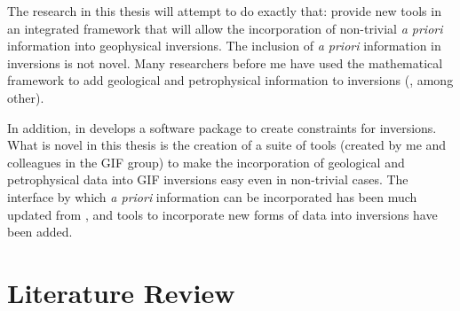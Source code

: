 The research in this thesis will attempt to do exactly that: provide new tools in an integrated framework that will allow the incorporation of non-trivial \emph{a priori} information into geophysical inversions. The inclusion of \emph{a priori} information in inversions is not novel. Many researchers before me have used the mathematical framework to add geological and petrophysical information to inversions (\citep{Lelievre2009Integrating},\citep{phillips2001thesis} among other). 

In addition, in \cite{williams2008geologically} develops a software package to create constraints for inversions. What is novel in this thesis is the creation of a suite of tools (created by me and colleagues in the \ac{GIF} group) to make the incorporation of geological and petrophysical data into \ac{GIF} inversions easy even in non-trivial cases. The interface by which \emph{a priori} information can be incorporated has been much updated from \citep{williams2008geologically}, and tools to incorporate new forms of data into inversions have been added.





\section{Literature Review}
\label{sec:Literature Review}


